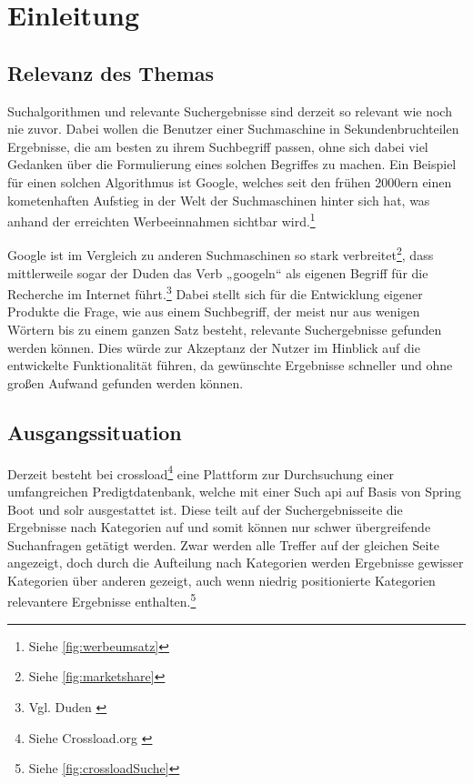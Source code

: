 \chapter{Einleitung}\label{ch:intro}

\section{Relevanz des Themas}
\label{sec:topicRelevance}
Suchalgorithmen und relevante Suchergebnisse sind derzeit so relevant wie noch nie zuvor.
Dabei wollen die Benutzer einer Suchmaschine in Sekundenbruchteilen Ergebnisse, die am besten zu ihrem Suchbegriff passen, ohne sich dabei viel Gedanken über die Formulierung eines solchen Begriffes zu machen.
Ein Beispiel für einen solchen Algorithmus ist Google, welches seit den frühen 2000ern einen kometenhaften Aufstieg in der Welt der Suchmaschinen hinter sich hat, was anhand der erreichten Werbeeinnahmen sichtbar wird.\footnote{Siehe \ref{fig:werbeumsatz}}

Google ist im Vergleich zu anderen Suchmaschinen so stark verbreitet\footnote{Siehe \ref{fig:marketshare}}, dass mittlerweile sogar der Duden das Verb „googeln“ als eigenen Begriff für die Recherche im Internet führt.\footnote{Vgl. Duden \cite{duden2022}}
Dabei stellt sich für die Entwicklung eigener Produkte die Frage, wie aus einem Suchbegriff, der meist nur aus wenigen Wörtern bis zu einem ganzen Satz besteht, relevante Suchergebnisse gefunden werden können. Dies würde zur Akzeptanz der Nutzer im Hinblick auf die entwickelte Funktionalität führen, da gewünschte Ergebnisse schneller und ohne großen Aufwand gefunden werden können.

\section{Ausgangssituation}
\label{sec:currentSituation}
Derzeit besteht bei \gls{crossload}\footnote{Siehe Crossload.org \cite{pfleiderer2022}} eine Plattform zur Durchsuchung einer umfangreichen Predigtdatenbank, welche mit einer Such \gls{api} auf Basis von Spring Boot und \gls{solr} ausgestattet ist.
Diese teilt auf der Suchergebnisseite die Ergebnisse nach Kategorien auf und somit können nur schwer übergreifende Suchanfragen getätigt werden.
Zwar werden alle Treffer auf der gleichen Seite angezeigt, doch durch die Aufteilung nach Kategorien werden Ergebnisse gewisser Kategorien über anderen gezeigt, auch wenn niedrig positionierte Kategorien relevantere Ergebnisse enthalten.\footnote{Siehe \ref{fig:crossloadSuche}}

